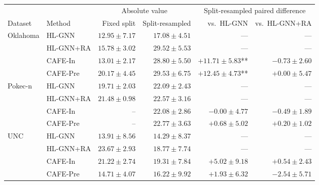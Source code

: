 \begin{tabular}{llrrrr}
\toprule
 & & \multicolumn{2}{c}{Absolute value} & \multicolumn{2}{c}{Split-resampled paired difference} \\
\cmidrule(lr){3-4}\cmidrule(lr){5-6}
Dataset & Method & Fixed split & Split-resampled & vs.\ HL-GNN & vs.\ HL-GNN+RA \\
\midrule
Oklahoma & HL-GNN & $12.95 \pm 7.17$ & $17.08 \pm 4.51$ & --- & --- \\
 & HL-GNN+RA & $15.78 \pm 3.02$ & $29.52 \pm 5.53$ & --- & --- \\
 & CAFE-In & $13.01 \pm 2.17$ & $28.80 \pm 5.50$ & $+11.71 \pm 5.83$** & $-0.73 \pm 2.60$ \\
 & CAFE-Pre & $20.17 \pm 4.45$ & $29.53 \pm 6.75$ & $+12.45 \pm 4.73$** & $+0.00 \pm 5.47$ \\
\addlinespace[2pt]
Pokec-n & HL-GNN & $19.71 \pm 2.03$ & $22.09 \pm 2.43$ & --- & --- \\
 & HL-GNN+RA & $21.48 \pm 0.98$ & $22.57 \pm 3.16$ & --- & --- \\
 & CAFE-In & -- & $22.08 \pm 2.86$ & $-0.00 \pm 4.77$ & $-0.49 \pm 1.89$ \\
 & CAFE-Pre & -- & $22.77 \pm 3.63$ & $+0.68 \pm 5.02$ & $+0.20 \pm 1.02$ \\
\addlinespace[2pt]
UNC & HL-GNN & $13.91 \pm 8.56$ & $14.29 \pm 8.37$ & --- & --- \\
 & HL-GNN+RA & $23.67 \pm 2.93$ & $18.77 \pm 7.74$ & --- & --- \\
 & CAFE-In & $21.22 \pm 2.74$ & $19.31 \pm 7.84$ & $+5.02 \pm 9.18$ & $+0.54 \pm 2.43$ \\
 & CAFE-Pre & $14.71 \pm 4.07$ & $16.22 \pm 9.92$ & $+1.93 \pm 6.32$ & $-2.54 \pm 5.71$ \\
\bottomrule
\end{tabular}
